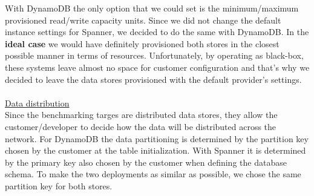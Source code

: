 \documentclass[letterpaper, 10 pt, conference]{ieeeconf}  %
\begin{document}
With DynamoDB the only option that we could set is the minimum/maximum provisioned read/write capacity units. Since we did not change the default instance settings for Spanner, we decided to do the same with DynamoDB. In the \textbf{ideal case} we would have definitely provisioned both stores in the closest possible manner in terms of resources. Unfortunately, by operating as black-box, these systems leave almost no space for customer configuration and that's why we decided to leave the data stores provisioned with the default provider's settings.
\\
\\
\underline{Data distribution}
\\
Since the benchmarking targes are distributed data stores, they allow the customer/developer to decide how the data will be distributed across the network. For DynamoDB the data partitioning is determined by the partition key chosen by the customer at the table initialization. With Spanner it is determined by the primary key also chosen by the customer when defining the database schema. To make the two deployments as similar as possible, we chose the same partition key for both stores.
\end{document}
